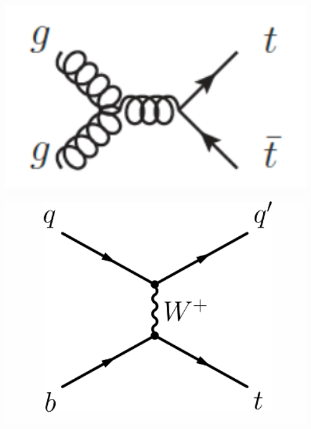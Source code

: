 \begin{frame}
\begin{columns}
\begin{column}{0.1\textwidth}
\includegraphics[width=1.6\textwidth]{Figures/FourTops/feyndiag_ttbar.png}\\
\includegraphics[width=1.5\textwidth]{Figures/FourTops/feyndiag_singletop_tchannel.png}
\end{column}
\end{columns}


\end{frame}
